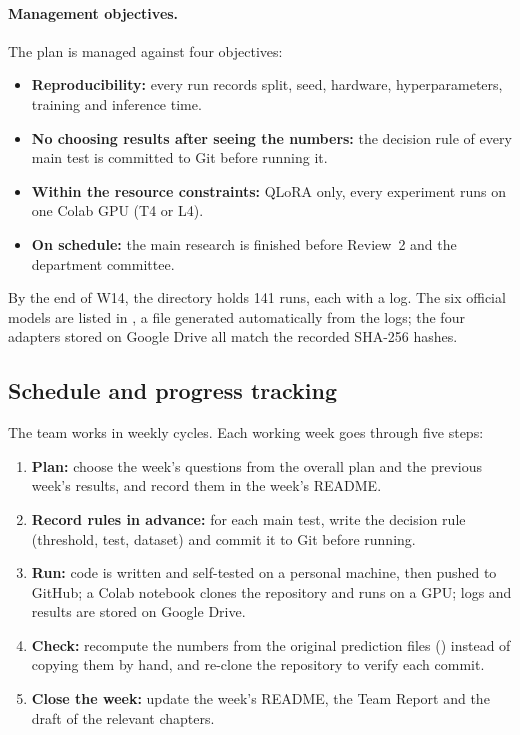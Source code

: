 \paragraph{Management objectives.} The plan is managed against four objectives:

\begin{itemize}
  \item \textbf{Reproducibility:} every run records split, seed, hardware, hyperparameters,
  training and inference time.
  \item \textbf{No choosing results after seeing the numbers:} the decision rule of every main
  test is committed to Git before running it.
  \item \textbf{Within the resource constraints:} QLoRA only, every experiment runs on one
  Colab GPU (T4 or L4).
  \item \textbf{On schedule:} the main research is finished before Review~2 and the
  department committee.
\end{itemize}

By the end of W14, the  directory holds 141 runs, each with a log. The six
official models are listed in , a file generated
automatically from the logs; the four adapters stored on Google Drive all match the recorded
SHA-256 hashes.

\subsection{Schedule and progress tracking}
\label{sec:pm-process}

The team works in weekly cycles. Each working week goes through five steps:

\begin{enumerate}
  \item \textbf{Plan:} choose the week's questions from the overall plan and the previous
  week's results, and record them in the week's README.
  \item \textbf{Record rules in advance:} for each main test, write the decision rule
  (threshold, test, dataset) and commit it to Git before running.
  \item \textbf{Run:} code is written and self-tested on a personal machine, then pushed to
  GitHub; a Colab notebook clones the repository and runs on a GPU; logs and results are
  stored on Google Drive.
  \item \textbf{Check:} recompute the numbers from the original prediction files
  () instead of copying them by hand, and re-clone the repository to
  verify each commit.
  \item \textbf{Close the week:} update the week's README, the Team Report and the draft of
  the relevant chapters.
\end{enumerate}

